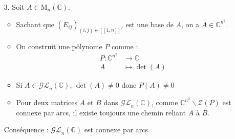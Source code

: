 \begin{solution}
\begin{enumerate}
  \item[3.] Soit $A \in \mathrm{M}_n (\mathbb{C})$. 
    \begin{itemize}

        \item Sachant que $(E _{ij}) _{ (i, j) \in [\![1,n]\!] ^{2}}$ est une base de $A$, on a $A \in \mathbb{C} ^{n ^{2}}$. 

        \item On construit une pôlynome $P$ comme :
          \begin{align}
            P : \mathbb{C} ^{n ^{2}} &\to \mathbb{C} \\ 
            A &\mapsto \det(A) 
          \end{align}

        \item Si $A \in \mathcal{GL} _{n}(\mathbb{C})$, $\det(A) \ne 0$ donc $P(A) \ne 0$

        \item Pour deux matrices $A$ et $B$ dans $\mathcal{GL}_n (\mathbb{C})$, comme $\mathbb{C}^{n ^{2}} \backslash \mathcal{Z}(P)$ est connexe par arcs, il existe toujours une chemin reliant $A$ à $B$.
    \end{itemize}

    Conséquence : $\mathcal{GL}_n (\mathbb{C})$ est connexe par arcs.
  
  \end{enumerate}
\end{solution}

